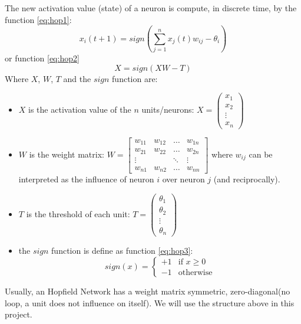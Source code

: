 The new activation value (state) of a neuron is compute, in discrete time, by the function \ref{eq:hop1}:
\begin{equation}
\label{eq:hop1}
x_i(t + 1) = sign(\sum_{j = 1}^{n}x_j(t)w_{ij} - \theta_i)
\end{equation}
or function \ref{eq:hop2}\\
\begin{equation}
\label{eq:hop2}
X = sign(XW - T)
\end{equation}
Where $X$, $W$, $T$ and the $sign$ function are:
\begin{itemize}
  \item $X$ is the activation value of the $n$ units/neurons: $X = \left(\begin{array}{c}
x_1\\ 
x_2\\
\vdots \\
x_n
\end{array}\right)$
  \item $W$ is the weight matrix: $W = \begin{bmatrix}
w_{11} & w_{12} & \dots & w_{1n}  \\
w_{21} & w_{22} & \dots & w_{2n} \\
\vdots  &            & \ddots & \vdots \\
w_{n1} & w_{n2} & \dots & w_{nn} 
\end{bmatrix}$ where $w_{ij}$ can be interpreted as the influence of neuron $i$ over neuron $j$ (and reciprocally).
  \item $T$ is the threshold of each unit: $T = \left(\begin{array}{c}
\theta_{1}\\ 
\theta_2\\
\vdots \\
\theta_{n}
\end{array}\right)$
  \item the $sign$ function is define as function \ref{eq:hop3}:
  \begin{equation}
	\label{eq:hop3}
	sign(x) = \begin{cases}
					+1 & \text{if } x \geq 0\\
					-1 & \text{otherwise}
				\end{cases}
  \end{equation}
\end{itemize}

Usually, an Hopfield Network has a weight matrix symmetric, zero-diagonal(no loop, a unit does not influence on itself). We will use the structure above in this project.

